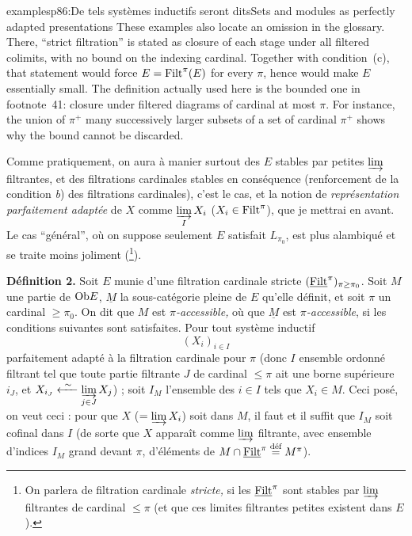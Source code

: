 \begin{dcomment}{examples}{p86:De tels systèmes inductifs seront dits}{Sets and modules as perfectly adapted presentations}
These examples also locate an omission in the glossary. There, ``strict filtration'' is stated as closure of each stage under all filtered colimits, with no bound on the indexing cardinal. Together with condition~(c), that statement would force $E=\mathrm{Filt}^\pi(E)$ for every $\pi$, hence would make $E$ essentially small. The definition actually used here is the bounded one in footnote~41: closure under filtered diagrams of cardinal at most $\pi$. For instance, the union of $\pi^+$ many successively larger subsets of a set of cardinal $\pi^+$ shows why the bound cannot be discarded.
\end{dcomment}


Comme pratiquement, on aura à manier surtout des $E$ stables par petites $\varinjlim$ filtrantes, et des filtrations cardinales stables en conséquence (renforcement de la condition \textit{b}) des filtrations cardinales), c'est le cas, et la notion de \textit{représentation parfaitement adaptée} de $X$ comme $\varinjlim\limits_{I} X_i$ ($X_i\in\mathrm{Filt}^\pi$), que je mettrai en avant. Le cas “général”, où on suppose seulement $E$ satisfait $L_{\pi_0}$, est plus alambiqué et se traite moins joliment (\footnote[41]{On parlera de filtration cardinale \textit{stricte,} si les $\underline{\mathrm{Filt}}^\pi$ sont stables par $\varinjlim$ filtrantes de cardinal $\le\pi$ (et que ces limites filtrantes petites existent dans $E$).}).

\textbf{Définition 2.} Soit $E$ munie d'une filtration cardinale stricte $(\underline{\mathrm{Filt}}^\pi)_{\pi\ge\pi_0}$. Soit $M$ une partie de $\mathrm{Ob} E$, $\underline{M}$ la sous-catégorie pleine de $E$ qu'elle définit, et soit $\pi$ un cardinal $\ge\pi_0$. On dit que $M$ est \textit{$\pi$-accessible,} où que $\underline{M}$ est \textit{$\pi$-accessible}, %
si les conditions suivantes sont satisfaites. Pour tout système inductif
\[
(X_i)_{i\in I}
\]
parfaitement adapté à la filtration cardinale pour $\pi$ (donc $I$ ensemble ordonné filtrant tel que toute partie filtrante $J$ de cardinal $\le\pi$ ait une borne supérieure $i_J$, et $X_{i_J}\xleftarrow{\ \sim\ }\varinjlim\limits_{j\in J} X_j$) ; soit $I_M$ l'ensemble des $i\in I$ tels que $X_i\in M$. Ceci posé, on veut ceci : pour que $X$ ($=\varinjlim X_i$) soit dans $M$, il faut et il suffit que $I_M$ soit cofinal dans $I$ (de sorte que $X$ apparaît comme $\varinjlim$ filtrante, avec ensemble d'indices $I_M$ grand devant $\pi$, d'éléments de $M\cap\underline{\mathrm{Filt}}^\pi\overset{\text{déf}}{=}M^\pi$).

